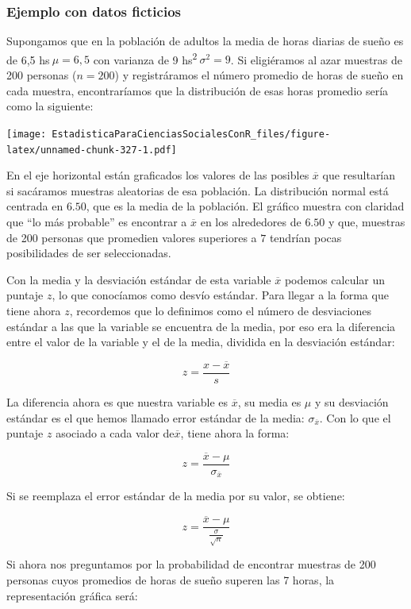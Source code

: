 \documentclass[]{book}
\begin{document}
\hypertarget{ejemplo-con-datos-ficticios}{%
\subsubsection{Ejemplo con datos ficticios}\label{ejemplo-con-datos-ficticios}}

Supongamos que en la población de adultos la media de horas diarias de
sueño es de 6,5 hs\(\ \mu = 6,5\) con varianza de 9
hs\textsuperscript{2}\(\ \sigma^{2} = 9\). Si eligiéramos al azar muestras
de 200 personas (\(n=200\)) y registráramos el número promedio de horas de sueño en cada muestra, encontraríamos que la distribución de esas horas
promedio sería como la siguiente:

\texttt{[image: EstadisticaParaCienciasSocialesConR\_files/figure-latex/unnamed-chunk-327-1.pdf]}

En el eje horizontal están graficados los valores de las posibles
\(\overline{x}\) que resultarían si sacáramos muestras aleatorias de esa
población. La distribución normal está centrada en \(6.50\), que es la media de la población. El gráfico muestra con claridad que ``lo más probable'' es encontrar a \(\overline{x}\) en los alrededores de \(6.50\) y que, muestras de 200 personas que promedien valores superiores a \(7\) tendrían pocas posibilidades de ser seleccionadas.

Con la media y la desviación estándar de esta variable \(\overline{x}\)
podemos calcular un puntaje \(z\), lo que conocíamos como desvío estándar.
Para llegar a la forma que tiene ahora \(z\), recordemos que lo definimos
como el número de desviaciones estándar a las que la variable se
encuentra de la media, por eso era la diferencia entre el valor de la
variable y el de la media, dividida en la desviación estándar:

\[z = \frac{x - \overline{x}}{s}\]

La diferencia ahora es que nuestra variable es \(\overline{x}\), su media
es \(\mu\) y su desviación estándar es el que hemos llamado error estándar de la media: \(\sigma_{\overline{x}}\). Con lo que el puntaje \(z\) asociado a cada valor de\(\overline{x}\), tiene ahora la forma:

\[z = \frac{\overline{x} - \mu}{\sigma_{\overline{x}}}\]

Si se reemplaza el error estándar de la media por su valor, se obtiene:

\[z = \frac{\overline{x} - \mu}{\frac{\sigma}{\sqrt{n}}}\]

Si ahora nos preguntamos por la probabilidad de encontrar muestras de
200 personas cuyos promedios de horas de sueño superen las 7 horas, la
representación gráfica será:
\end{document}
